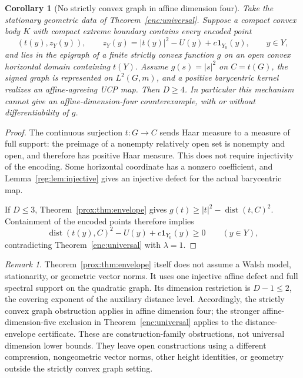 \documentclass[11pt,letterpaper]{amsart}
\newtheorem{corollary}[theorem]{Corollary}
\theoremstyle{definition}
\theoremstyle{remark}
\newtheorem{remark}[theorem]{Remark}
\numberwithin{equation}{section}
\DeclareMathOperator{\dist}{dist}
\begin{document}
\begin{corollary}[No strictly convex graph in affine dimension four]
\label{prox:cor:walsh}
Take the stationary geometric data of
Theorem~\ref{enc:universal}. Suppose a compact convex body $K$
with compact extreme boundary contains every encoded point
\[
 (t(y),z_Y(y)),\qquad
 z_Y(y)=|t(y)|^2-U(y)+c\mathbf1_{Y_0}(y),\qquad y\in Y,
\]
and lies in the epigraph of a finite strictly convex function
$g$ on an open convex horizontal domain containing $t(Y)$.
Assume $g(s)=|s|^2$ on $C=t(G)$, the signed graph is represented
on $L^2(G,m)$, and a positive barycentric kernel realizes an
affine-agreeing UCP map. Then $D\ge4$.
In particular this mechanism cannot give an affine-dimension-four
counterexample, with or without differentiability of $g$.
\end{corollary}
\begin{proof}
The continuous surjection $t:G\to C$ sends Haar measure to a
measure of full support: the preimage of a nonempty relatively
open set is nonempty and open, and therefore has positive Haar
measure. This does not require injectivity of the encoding.
Some horizontal coordinate has a nonzero coefficient, and
Lemma~\ref{reg:lem:injective} gives an injective defect for the
actual barycentric map.

If $D\le3$, Theorem~\ref{prox:thm:envelope} gives
$g(t)\ge|t|^2-\dist(t,C)^2$. Containment of the encoded points
therefore implies
\[
 \dist(t(y),C)^2-U(y)+c\mathbf1_{Y_0}(y)\ge0\qquad(y\in Y),
\]
contradicting Theorem~\ref{enc:universal} with $\lambda=1$.
\end{proof}

\begin{remark}\label{prox:rem:scope}
Theorem~\ref{prox:thm:envelope} itself does not assume a Walsh
model, stationarity, or geometric vector norms. It uses one
injective affine defect and full spectral support on the
quadratic graph. Its dimension restriction is $D-1\le2$, the
covering exponent of the auxiliary distance level. Accordingly,
the strictly convex graph obstruction applies in affine dimension
four; the stronger affine-dimension-five exclusion in
Theorem~\ref{enc:universal} applies to the distance-envelope
certificate. These are construction-family obstructions, not
universal dimension lower bounds. They leave open constructions
using a different compression, nongeometric vector norms, other
height identities, or geometry outside the strictly convex graph
setting.
\end{remark}
\end{document}
